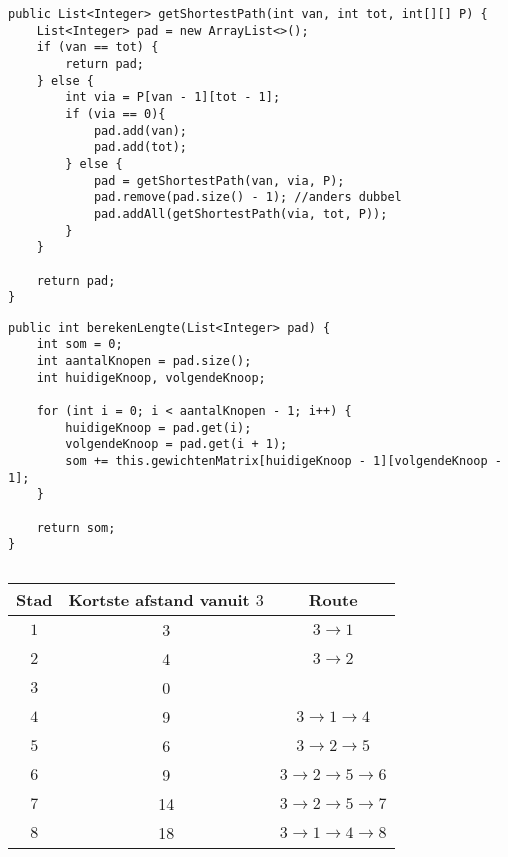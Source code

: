 \begin{Oplossing}{8.4}
\begin{lstlisting}[caption={getShortestPath}, label=FloydgetShortestPath]
public List<Integer> getShortestPath(int van, int tot, int[][] P) {
	List<Integer> pad = new ArrayList<>();
	if (van == tot) {
		return pad;
	} else {
		int via = P[van - 1][tot - 1];
		if (via == 0){
			pad.add(van);
			pad.add(tot);
		} else {
			pad = getShortestPath(van, via, P);
			pad.remove(pad.size() - 1); //anders dubbel
			pad.addAll(getShortestPath(via, tot, P));
		}
	}

	return pad;
}
\end{lstlisting}
\end{Oplossing}
\begin{Oplossing}{8.5}
\begin{lstlisting}[caption={berekenLengte}, label=FloydberekenLengte]
public int berekenLengte(List<Integer> pad) {
	int som = 0;
	int aantalKnopen = pad.size();
	int huidigeKnoop, volgendeKnoop;
		
	for (int i = 0; i < aantalKnopen - 1; i++) {
		huidigeKnoop = pad.get(i);
		volgendeKnoop = pad.get(i + 1);
		som += this.gewichtenMatrix[huidigeKnoop - 1][volgendeKnoop - 1];
	}
		
	return som;
}
\end{lstlisting}
\end{Oplossing}
\begin{Oplossing}{9.1}
$\quad$\\
$\quad$\\
\begin{tabular}{ccc}
\toprule
Stad & Kortste afstand vanuit $3$ & Route \\
\midrule
$1$ & 3 & $3\rightarrow 1$ \\
\midrule
$2$ & 4 & $3\rightarrow 2$ \\
\midrule
$3$ & 0 \\
\midrule
$4$ & 9&$3\rightarrow 1 \rightarrow 4$ \\
\midrule
$5$ & 6 & $3\rightarrow 2 \rightarrow 5$\\
\midrule
$6$ & 9 & $3\rightarrow 2 \rightarrow 5 \rightarrow 6$ \\
\midrule
$7$ & 14 & $3 \rightarrow 2 \rightarrow 5 \rightarrow 7$ \\
\midrule
$8$ & 18 & $3 \rightarrow 1 \rightarrow 4 \rightarrow 8$ \\
\bottomrule
\end{tabular}
\end{Oplossing}
